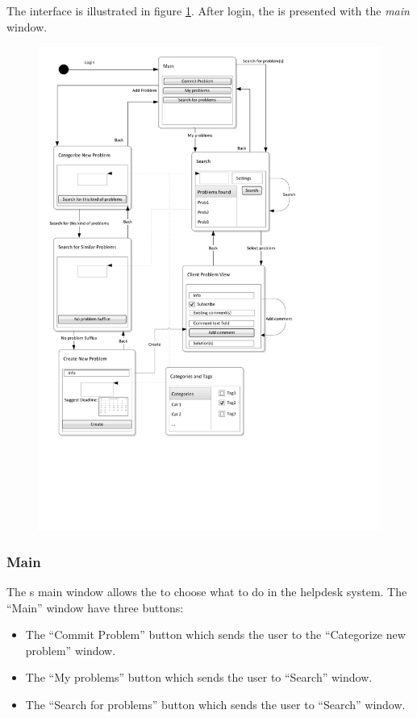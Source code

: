 \subsection{\cinterface}
\label{sec:client_interface}

The \aclient[] interface is illustrated in figure \ref{fig:client_interface}.
After login, the \aclient[] is presented with the \textit{main} window. 


\begin{figure}[p]
	\centering
		\includegraphics[width = \textwidth, clip=true, trim=0 4cm 5cm 0]{input/application_domain_analysis/Navigation_DiagramClient.pdf}
	\label{fig:client_interface} %
\end{figure}

\subsubsection{Main}
The \aclient s main window allows the \aclient[] to choose what to do in the helpdesk system. The ``Main'' window have three buttons:
\begin{itemize}
	\item The ``Commit Problem'' button which sends the user to the ``Categorize new problem'' window.
	\item The ``My problems'' button which sends the user to ``Search'' window.
	\item The ``Search for problems'' button which sends the user to ``Search'' window.
\end{itemize}

